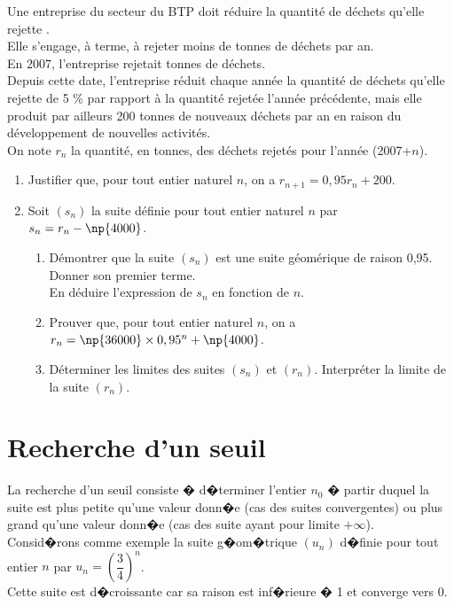 \documentclass[a4paper,12pt,twoside,french]{extarticle}
\begin{document}
Une entreprise du secteur du BTP doit réduire la quantité de déchets qu'elle rejette .\\
Elle s'engage, à terme, à rejeter moins de  tonnes de déchets par an.\\
En 2007, l'entreprise rejetait  tonnes de déchets.\\
Depuis cette date, l'entreprise réduit chaque année la quantité de déchets qu'elle rejette de 5 \%  par rapport à la quantité rejetée l'année précédente, mais elle produit par ailleurs 200 tonnes de nouveaux déchets par an en raison du développement de nouvelles activités.\\
On note $r_n$ la quantité, en tonnes, des déchets rejetés pour l'année (2007+$n$).
\begin{enumerate}
\item Justifier que, pour tout entier naturel $n$, on  a $r_{n+1}=0,95r_n+200$.
\item Soit $(s_n)$ la suite définie pour tout entier naturel $n$ par $s_n=r_n-\np{4000}$.
\begin{enumerate}
\item Démontrer que la suite $(s_n)$ est une suite géomérique de raison 0,95. Donner son premier terme.\\
En déduire l'expression de $s_n$ en fonction de $n$.
\item Prouver que, pour tout entier naturel $n$, on a $r_n=\np{36000} \times 0,95^n+\np{4000}$.
\item Déterminer les limites des suites $(s_n)$ et $(r_n)$. Interpréter la limite de la suite $(r_n)$.\\
\end{enumerate}
\end{enumerate}


\newpage
\section{Recherche d'un seuil}

\noindent La recherche d'un seuil consiste � d�terminer l'entier $n_0$ � partir duquel la suite est plus petite qu'une valeur donn�e (cas des suites convergentes) ou plus grand qu'une valeur donn�e (cas des suite ayant pour limite $+\infty$).\\

\noindent Consid�rons comme exemple la suite g�om�trique $(u_n)$ d�finie pour tout entier $n$ par $u_n=\left(\dfrac{3}{4}\right)^n$.\\
Cette suite est d�croissante car sa raison est inf�rieure � 1 et converge vers 0.\\
\end{document}
